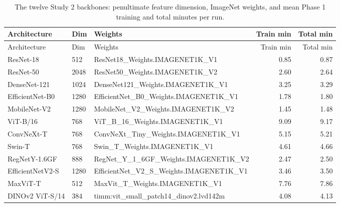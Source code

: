 {\footnotesize
\setlength{\tabcolsep}{3.5pt}
\begin{longtable}{llp{4.6cm}rr}
\caption{The twelve Study 2 backbones: penultimate feature dimension, ImageNet weights, and mean Phase 1 training and total minutes per run.}\label{r:tab:archs}\\
\toprule
Architecture & Dim & Weights & Train min & Total min \\
\midrule
\endfirsthead
\toprule
Architecture & Dim & Weights & Train min & Total min \\
\midrule
\endhead
\bottomrule
\endfoot
ResNet-18 & 512 & ResNet18\_\allowbreak{}Weights.\allowbreak{}IMAGENET1K\_\allowbreak{}V1 & 0.85 & 0.87 \\
ResNet-50 & 2048 & ResNet50\_\allowbreak{}Weights.\allowbreak{}IMAGENET1K\_\allowbreak{}V2 & 2.60 & 2.64 \\
DenseNet-121 & 1024 & DenseNet121\_\allowbreak{}Weights.\allowbreak{}IMAGENET1K\_\allowbreak{}V1 & 3.25 & 3.29 \\
EfficientNet-B0 & 1280 & EfficientNet\_\allowbreak{}B0\_\allowbreak{}Weights.\allowbreak{}IMAGENET1K\_\allowbreak{}V1 & 1.78 & 1.80 \\
MobileNet-V2 & 1280 & MobileNet\_\allowbreak{}V2\_\allowbreak{}Weights.\allowbreak{}IMAGENET1K\_\allowbreak{}V2 & 1.45 & 1.48 \\
ViT-B/16 & 768 & ViT\_\allowbreak{}B\_\allowbreak{}16\_\allowbreak{}Weights.\allowbreak{}IMAGENET1K\_\allowbreak{}V1 & 9.09 & 9.17 \\
ConvNeXt-T & 768 & ConvNeXt\_\allowbreak{}Tiny\_\allowbreak{}Weights.\allowbreak{}IMAGENET1K\_\allowbreak{}V1 & 5.15 & 5.21 \\
Swin-T & 768 & Swin\_\allowbreak{}T\_\allowbreak{}Weights.\allowbreak{}IMAGENET1K\_\allowbreak{}V1 & 4.61 & 4.66 \\
RegNetY-1.6GF & 888 & RegNet\_\allowbreak{}Y\_\allowbreak{}1\_\allowbreak{}6GF\_\allowbreak{}Weights.\allowbreak{}IMAGENET1K\_\allowbreak{}V2 & 2.47 & 2.50 \\
EfficientNetV2-S & 1280 & EfficientNet\_\allowbreak{}V2\_\allowbreak{}S\_\allowbreak{}Weights.\allowbreak{}IMAGENET1K\_\allowbreak{}V1 & 3.46 & 3.50 \\
MaxViT-T & 512 & MaxVit\_\allowbreak{}T\_\allowbreak{}Weights.\allowbreak{}IMAGENET1K\_\allowbreak{}V1 & 7.76 & 7.86 \\
DINOv2 ViT-S/14 & 384 & timm:vit\_\allowbreak{}small\_\allowbreak{}patch14\_\allowbreak{}dinov2.\allowbreak{}lvd142m & 4.08 & 4.13 \\
\end{longtable}
}

